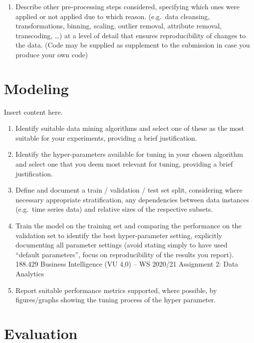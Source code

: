 \documentclass[sigchi]{acmart}
\def\tightlist{}
\begin{document}
\begin{enumerate}
\def\labelenumi{\alph{enumi}.}
\setcounter{enumi}{2}
\tightlist
\item
  Describe other pre-processing steps considered, specifying which ones were applied or not applied due to which reason. (e.g.~data cleansing, transformations, binning, scaling, outlier removal, attribute removal, transcoding, \ldots) at a level of detail that ensures reproducibility of changes to the data. (Code may be supplied as supplement to the submission in case you produce your own code)
\end{enumerate}

\hypertarget{modeling}{%
\section{Modeling}\label{modeling}}

Insert content here.

\begin{enumerate}
\def\labelenumi{\alph{enumi}.}
\tightlist
\item
  Identify suitable data mining algorithms and select one of these as the most suitable for your experiments, providing a brief justification.
\item
  Identify the hyper-parameters available for tuning in your chosen algorithm and select one that you deem most relevant for tuning, providing a brief justification.
\item
  Define and document a train / validation / test set split, considering where necessary appropriate stratification, any dependencies between data instances (e.g.~time series data) and relative sizes of the respective subsets.
\item
  Train the model on the training set and comparing the performance on the validation set to identify the best hyper-parameter setting, explicitly documenting all parameter settings (avoid stating simply to have used ``default parameters'', focus on reproducibility of the results you report).
  188.429 Business Intelligence (VU 4,0) -- WS 2020/21 Assignment 2: Data Analytics
\item
  Report suitable performance metrics supported, where possible, by figures/graphs showing the tuning process of the hyper parameter.
\end{enumerate}

\hypertarget{evaluation}{%
\section{Evaluation}\label{evaluation}}
\end{document}
